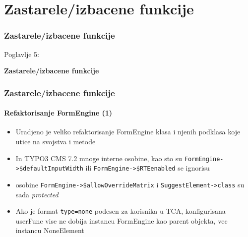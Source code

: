 %

\section{Zastarele/izbacene funkcije}
\begin{frame}[fragile]
	\frametitle{Zastarele/izbacene funkcije}

	\begin{center}\huge{Poglavlje 5:}\end{center}
	\begin{center}\huge{\color{typo3darkgrey}\textbf{Zastarele/izbacene funkcije}}\end{center}

\end{frame}


\begin{frame}[fragile]
	\frametitle{Zastarele/izbacene funkcije}
	\framesubtitle{Refaktorisanje FormEngine (1)}

	\begin{itemize}

		\item Uradjeno je veliko refaktorisanje FormEngine klasa i njenih podklasa koje utice na svojstva i metode

		\item In TYPO3 CMS 7.2 mnoge interne osobine, kao sto su
			\small\texttt{FormEngine->\$defaultInputWidth}\normalsize\space
			ili
			\small\texttt{FormEngine->\$RTEenabled}\normalsize\space\newline
			se ignorisu

		\item osobine
			\small\texttt{FormEngine->\$allowOverrideMatrix}\normalsize\space
			i
			\small\texttt{SuggestElement->class}\normalsize\space
			su sada \textit{protected}

		\item Ako je format \texttt{type=none} podesen za korisnika u TCA, konfigurisana userFunc
			vise ne dobija instancu FormEngine kao parent objekta,
			vec instancu NoneElement

	\end{itemize}

\end{frame}

